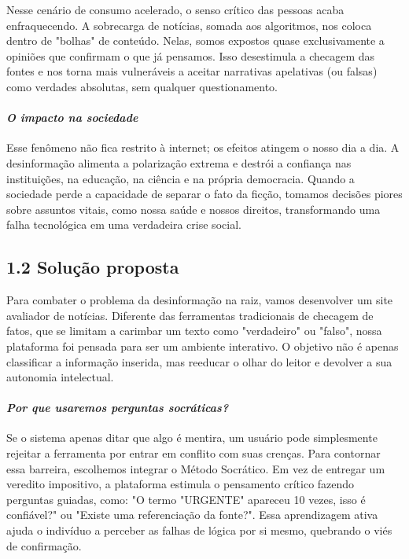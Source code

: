 \documentclass[
  brazilian,
  11pt,
]{article}
\begin{document}
Nesse cenário de consumo acelerado, o senso crítico das pessoas acaba enfraquecendo. A sobrecarga de notícias, somada aos algoritmos, nos coloca dentro de "bolhas" de conteúdo. Nelas, somos expostos quase exclusivamente a opiniões que confirmam o que já pensamos. Isso desestimula a checagem das fontes e nos torna mais vulneráveis a aceitar narrativas apelativas (ou falsas) como verdades absolutas, sem qualquer questionamento.

\paragraph{\texorpdfstring{\emph{O impacto na sociedade}}{O impacto na sociedade}}\label{o-impacto-na-sociedade}

Esse fenômeno não fica restrito à internet; os efeitos atingem o nosso dia a dia. A desinformação alimenta a polarização extrema e destrói a confiança nas instituições, na educação, na ciência e na própria democracia. Quando a sociedade perde a capacidade de separar o fato da ficção, tomamos decisões piores sobre assuntos vitais, como nossa saúde e nossos direitos, transformando uma falha tecnológica em uma verdadeira crise social.

\subsection{1.2 Solução proposta}\label{soluuxe7uxe3o-proposta}

Para combater o problema da desinformação na raiz, vamos desenvolver um site avaliador de notícias. Diferente das ferramentas tradicionais de checagem de fatos, que se limitam a carimbar um texto como "verdadeiro" ou "falso", nossa plataforma foi pensada para ser um ambiente interativo. O objetivo não é apenas classificar a informação inserida, mas reeducar o olhar do leitor e devolver a sua autonomia intelectual.

\paragraph{\texorpdfstring{\emph{Por que usaremos perguntas socráticas?}}{Por que usaremos perguntas socráticas?}}\label{por-que-usaremos-perguntas-socruxe1ticas}

Se o sistema apenas ditar que algo é mentira, um usuário pode simplesmente rejeitar a ferramenta por entrar em conflito com suas crenças. Para contornar essa barreira, escolhemos integrar o Método Socrático. Em vez de entregar um veredito impositivo, a plataforma estimula o pensamento crítico fazendo perguntas guiadas, como: "O termo "URGENTE" apareceu 10 vezes, isso é confiável?" ou "Existe uma referenciação da fonte?". Essa aprendizagem ativa ajuda o indivíduo a perceber as falhas de lógica por si mesmo, quebrando o viés de confirmação.
\end{document}
